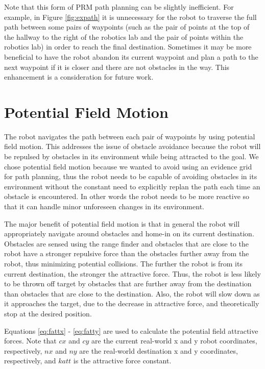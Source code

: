 \documentclass[12pt]{article}
\begin{document}
Note that this form of PRM path planning can be slightly inefficient. For example, in Figure \ref{fig:expath} it is unnecessary for the robot to traverse the full path between some pairs of waypoints (such as the pair of points at the top of the hallway to the right of the robotics lab and the pair of points within the robotics lab) in order to reach the final destination. Sometimes it may be more beneficial to have the robot abandon its current waypoint and plan a path to the next waypoint if it is closer and there are not obstacles in the way. This enhancement is a consideration for future work. 


\section{Potential Field Motion}
\label{sec:potential}

The robot navigates the path between each pair of waypoints by using potential field motion. This addresses the issue of obstacle avoidance because the robot will be repulsed by obstacles in its environment while being attracted to the goal. We chose potential field motion because we wanted to avoid using an evidence grid for path planning, thus the robot needs to be capable of avoiding obstacles in its environment without the constant need to explicitly replan the path each time an obstacle is encountered. In other words the robot needs to be more reactive so that it can handle minor unforeseen changes in its environment.

The major benefit of potential field motion is that in general the robot will appropriately navigate around obstacles and home-in on its current destination. Obstacles are sensed using the range finder and obstacles that are close to the robot have a stronger repulsive force than the obstacles further away from the robot, thus minimizing potential collisions. The further the robot is from its current destination, the stronger the attractive force. Thus, the robot is less likely to be thrown off target by obstacles that are further away from the destination than obstacles that are close to the destination. Also, the robot will slow down as it approaches the target, due to the decrease in attractive force, and theoretically stop at the desired position. 

Equations \ref{eq:fattx} - \ref{eq:fatty} are used to calculate the potential field attractive forces. Note that $cx$ and $cy$ are the current real-world x and y robot coordinates, respectively, $nx$ and $ny$ are the real-world destination x and y coordinates, respectively, and $katt$ is the attractive force constant.
\end{document}
